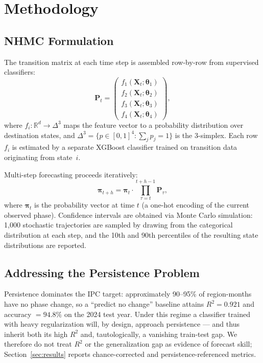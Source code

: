 \documentclass[11pt,letterpaper]{article}
\newcommand{\R}{\mathbb{R}}
\begin{document}
\section{Methodology}\label{sec:methods}

\subsection{NHMC Formulation}

The transition matrix at each time step is assembled row-by-row from supervised classifiers:
\begin{equation}\label{eq:assembly}
  \mathbf{P}_t = \begin{pmatrix}
    f_1(\mathbf{X}_t; \boldsymbol{\theta}_1) \\
    f_2(\mathbf{X}_t; \boldsymbol{\theta}_2) \\
    f_3(\mathbf{X}_t; \boldsymbol{\theta}_3) \\
    f_4(\mathbf{X}_t; \boldsymbol{\theta}_4)
  \end{pmatrix},
\end{equation}
where $f_i : \R^d \to \Delta^3$ maps the feature vector to a probability distribution over destination states, and $\Delta^3 = \{p \in [0,1]^4 : \sum_j p_j = 1\}$ is the 3-simplex. Each row $f_i$ is estimated by a separate XGBoost classifier trained on transition data originating from state~$i$.

Multi-step forecasting proceeds iteratively:
\begin{equation}\label{eq:forecast}
  \boldsymbol{\pi}_{t+h} = \boldsymbol{\pi}_t \cdot \prod_{\tau=t}^{t+h-1} \mathbf{P}_\tau,
\end{equation}
where $\boldsymbol{\pi}_t$ is the probability vector at time $t$ (a one-hot encoding of the current observed phase). Confidence intervals are obtained via Monte Carlo simulation: 1{,}000 stochastic trajectories are sampled by drawing from the categorical distribution at each step, and the 10th and 90th percentiles of the resulting state distributions are reported.

\subsection{Addressing the Persistence Problem}

Persistence dominates the IPC target: approximately 90--95\% of region-months have no phase change, so a ``predict no change'' baseline attains $R^2 = 0.921$ and accuracy $= 94.8\%$ on the 2024 test year. Under this regime a classifier trained with heavy regularization will, by design, approach persistence --- and thus inherit both its high $R^2$ and, tautologically, a vanishing train-test gap. We therefore do not treat $R^2$ or the generalization gap as evidence of forecast skill; Section~\ref{sec:results} reports chance-corrected and persistence-referenced metrics.
\end{document}
